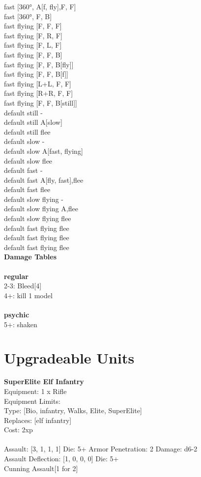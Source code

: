 fast [360°, A[f, fly],F, F] \\
fast [360°, F, B] \\
fast flying [F, F, F] \\
fast flying [F, R, F] \\
fast flying [F, L, F] \\
fast flying [F, F, B] \\
fast flying [F, F, B[fly]] \\
fast flying [F, F, B[f]] \\
fast flying [L+L, F, F] \\
fast flying [R+R, F, F] \\
fast flying [F, F, B[still]] \\
default still - \\
default still A[slow] \\
default still flee \\
default slow - \\
default slow A[fast, flying] \\
default slow flee \\
default fast - \\
default fast A[fly, fast],flee \\
default fast flee \\
default slow flying - \\
default slow flying A,flee \\
default slow flying flee \\
default fast flying flee \\
default fast flying flee \\
default fast flying flee \\


{\bf Damage Tables} \\
\ \\ {\bf regular } \\
2-3: Bleed[4] \\
4+: kill 1 model \\
\ \\ {\bf psychic } \\
5+: shaken \\










\pagebreak\section{Upgradeable Units}{\bf SuperElite Elf Infantry } \\
Equipment: 1 x Rifle \\
Equipment Limits:  \\
Type: [Bio, infantry, Walks, Elite, SuperElite] \\
Replaces: [elf infantry] \\
Cost: 2xp\\
\ \\
Assault: [3, 1, 1, 1] Die: 5+ Armor Penetration: 2 Damage: d6-2 \\
Assault Deflection: [1, 0, 0, 0] Die: 5+\\
\indent Cunning Assault[1 for 2]\\ 
 
